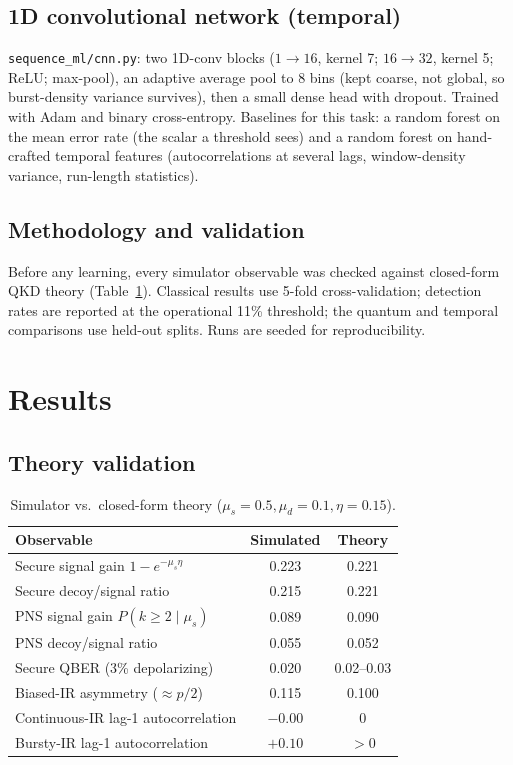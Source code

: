 \documentclass[11pt]{article}
\begin{document}
\subsection{1D convolutional network (temporal)}
\texttt{sequence\_ml/cnn.py}: two 1D-conv blocks
($1{\to}16$, kernel 7; $16{\to}32$, kernel 5; ReLU; max-pool), an adaptive average
pool to 8 bins (kept coarse, not global, so burst-density variance survives), then a
small dense head with dropout. Trained with Adam and binary cross-entropy. Baselines
for this task: a random forest on the mean error rate (the scalar a threshold sees)
and a random forest on hand-crafted temporal features (autocorrelations at several
lags, window-density variance, run-length statistics).

\subsection{Methodology and validation}
Before any learning, every simulator observable was checked against closed-form QKD
theory (Table~\ref{tab:theory}). Classical results use 5-fold cross-validation;
detection rates are reported at the operational 11\% threshold; the quantum and
temporal comparisons use held-out splits. Runs are seeded for reproducibility.

\section{Results}
\subsection{Theory validation}
\begin{table}[h]
  \centering
  \caption{Simulator vs.\ closed-form theory ($\mu_s{=}0.5,\mu_d{=}0.1,\eta{=}0.15$).}
  \label{tab:theory}
  \begin{tabular}{lcc}
    \toprule
    Observable & Simulated & Theory \\ \midrule
    Secure signal gain $1-e^{-\mu_s\eta}$       & 0.223 & 0.221 \\
    Secure decoy/signal ratio                   & 0.215 & 0.221 \\
    PNS signal gain $P(k\ge2\mid\mu_s)$         & 0.089 & 0.090 \\
    PNS decoy/signal ratio                      & 0.055 & 0.052 \\
    Secure QBER (3\% depolarizing)              & 0.020 & 0.02--0.03 \\
    Biased-IR asymmetry ($\approx p/2$)         & 0.115 & 0.100 \\
    Continuous-IR lag-1 autocorrelation         & $-0.00$ & $0$ \\
    Bursty-IR lag-1 autocorrelation             & $+0.10$ & $>0$ \\
    \bottomrule
  \end{tabular}
\end{table}
\end{document}
